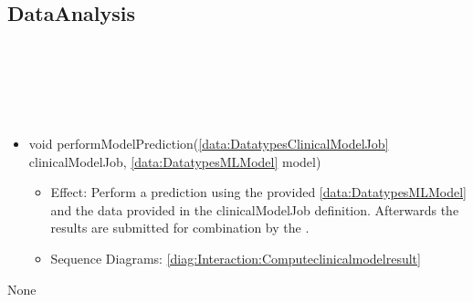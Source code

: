   \subsection{DataAnalysis}\label{int:InterfacesDataAnalysis}
    \begin{description}
      \item[Provided by:] \iconcomponent{}~
      \item[Required by:] \iconcomponent{}~ 
      \item[Operations:] ~
    \begin{itemize}[noitemsep,nolistsep,leftmargin=-.25cm]
      \item \textsf{void performModelPrediction(\ref{data:DatatypesClinicalModelJob} clinicalModelJob, \ref{data:DatatypesMLModel} model)}
        \begin{itemize}[noitemsep,nolistsep]
           \item Effect: Perform a prediction using the provided \ref{data:DatatypesMLModel} and the data provided in the clinicalModelJob definition.
Afterwards the results are submitted for combination by the . 
           \item Sequence Diagrams: \cref{diag:Interaction:Computeclinicalmodelresult}
        \end{itemize}
    \end{itemize}
      \item[Diagrams:] None
    \end{description}

